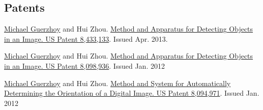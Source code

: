 \documentclass[letterpaper,11pt]{article}
\begin{document}
\subsection*{Patents}
\begin{revnumerate}
\item
\underline{Michael Guerzhoy} and Hui Zhou. \href{http://www.google.com/patents/US8433133}{Method and Apparatus for Detecting Objects in an Image. US Patent 8,433,133}. Issued Apr. 2013. 
\item
\underline{Michael Guerzhoy} and Hui Zhou. \href{http://www.google.com/patents/US8098936}{Method and Apparatus for Detecting Objects in an Image. US Patent 8,098,936}. Issued Jan. 2012
\item
\underline{Michael Guerzhoy} and Hui Zhou. \href{http://www.google.com/patents/US8094971}{Method and System for Automatically Determining the Orientation of a Digital Image. US Patent 8,094,971}. Issued Jan. 2012
\end{revnumerate}
\end{document}
